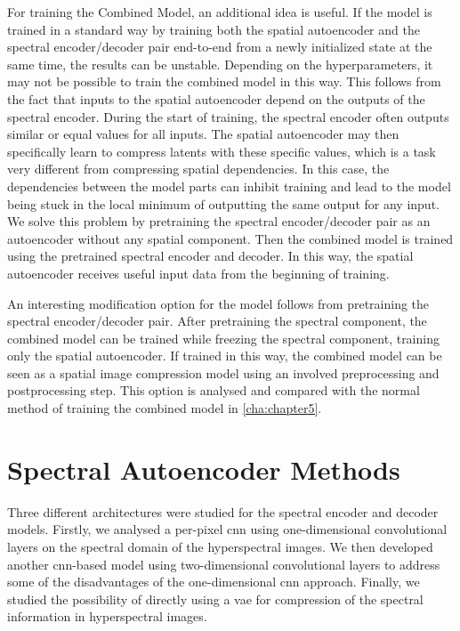 For training the Combined Model, an additional idea is useful. If the model is trained in a standard way by training both the spatial autoencoder and the spectral encoder/decoder pair end-to-end from a newly initialized state at the same time, the results can be unstable. Depending on the hyperparameters, it may not be possible to train the combined model in this way. This follows from the fact that inputs to the spatial autoencoder depend on the outputs of the spectral encoder. During the start of training, the spectral encoder often outputs similar or equal values for all inputs. The spatial autoencoder may then specifically learn to compress latents with these specific values, which is a task very different from compressing spatial dependencies. In this case, the dependencies between the model parts can inhibit training and lead to the model being stuck in the local minimum of outputting the same output for any input. We solve this problem by pretraining the spectral encoder/decoder pair as an autoencoder without any spatial component. Then the combined model is trained using the pretrained spectral encoder and decoder. In this way, the spatial autoencoder receives useful input data from the beginning of training. 

An interesting modification option for the model follows from pretraining the spectral encoder/decoder pair. After pretraining the spectral component, the combined model can be trained while freezing the spectral component, training only the spatial autoencoder. If trained in this way, the combined model can be seen as a spatial image compression model using an involved preprocessing and postprocessing step. This option is analysed and compared with the normal method of training the combined model in \autoref{cha:chapter5}.
\section{Spectral Autoencoder Methods}
Three different architectures were studied for the spectral encoder and decoder models. Firstly, we analysed a per-pixel \ac{cnn} using one-dimensional convolutional layers on the spectral domain of the hyperspectral images. We then developed another \ac{cnn}-based model using two-dimensional convolutional layers to address some of the disadvantages of the one-dimensional \ac{cnn} approach. Finally, we studied the possibility of directly using a \ac{vae} for compression of the spectral information in hyperspectral images. 
